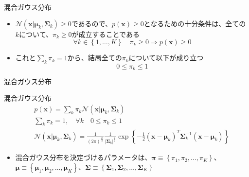 \documentclass[dvipdfmx,notheorems,t]{beamer}
\begin{document}
\begin{frame}{混合ガウス分布}
\begin{itemize}
\begin{itemize}
		\item $\mathcal{N}(\bm{x} | \bm{\mu}_k, \bm{\Sigma}_k) \ge 0$であるので、$p(\bm{x}) \ge 0$となるための十分条件は、全ての$k$について、$\pi_k \ge 0$が成立することである
		\begin{equation}
			\forall k \in \left\{ 1, \ldots, K \right\} \quad \pi_k \ge 0 \Rightarrow p(\bm{x}) \ge 0 \nonumber
		\end{equation}
		
		\item これと$\sum_k \pi_k = 1$から、結局全ての$\pi_k$について以下が成り立つ
		\begin{equation}
			0 \le \pi_k \le 1
		\end{equation}
	\end{itemize}
\end{itemize}

\end{frame}

\begin{frame}{混合ガウス分布}

\begin{block}{混合ガウス分布}
	\begin{eqnarray}
		&& p(\bm{x}) = \sum_k \pi_k \mathcal{N}(\bm{x} | \bm{\mu}_k, \bm{\Sigma}_k) \nonumber \\
		&& \sum_k \pi_k = 1, \quad \forall k \quad 0 \le \pi_k \le 1 \nonumber \\
		&& \mathcal{N}(\bm{x} | \bm{\mu}_k, \bm{\Sigma}_k) = \frac{1}{(2 \pi)^\frac{D}{2}} \frac{1}{|\bm{\Sigma}_k|^\frac{1}{2}} \exp \left\{ -\frac{1}{2} (\bm{x} - \bm{\mu}_k)^T \bm{\Sigma}_k^{-1} (\bm{x} - \bm{\mu}_k) \right\} \nonumber
	\end{eqnarray}
	
	\begin{itemize}
		\item 混合ガウス分布を決定づけるパラメータは、$\bm{\pi} \equiv \left\{ \pi_1, \pi_2, \ldots, \pi_K \right\}$、$\bm{\mu} \equiv \left\{ \bm{\mu}_1, \bm{\mu}_2, \ldots, \bm{\mu}_K \right\}$、$\bm{\Sigma} \equiv \left\{ \bm{\Sigma}_1, \bm{\Sigma}_2, \ldots, \bm{\Sigma}_K \right\}$
	\end{itemize}
\end{block}

\end{frame}
\end{document}
